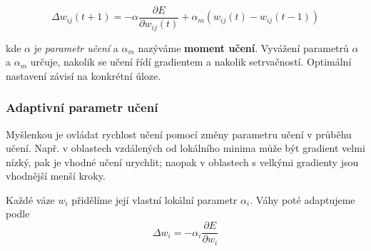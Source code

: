 \documentclass[11pt]{report} %
\numberwithin{equation}{section}
\begin{document}
$$
\Delta w_{ij}(t+1) = - \alpha \frac{\partial E}{\partial w_{ij}(t)} + \alpha_m(w_{ij}(t) - w_{ij}(t-1))
$$

kde $\alpha$ je \textit{parametr učení} a $\alpha_m$ nazýváme \textbf{moment učení}. Vyvážení parametrů $\alpha$ a $\alpha_m$ určuje, nakolik se učení řídí gradientem a nakolik setrvačností. Optimální nastavení závisí na konkrétní úloze.

\subsubsection{Adaptivní parametr učení}
Myšlenkou je ovládat rychlost učení pomocí změny parametru učení v průběhu učení. Např. v oblastech vzdálených od lokálního minima může být gradient velmi nízký, pak je vhodné učení urychlit; naopak v oblastech s velkými gradienty jsou vhodnější menší kroky.

Každé váze $w_i$ přidělíme její vlastní lokální parametr $\alpha_i$. Váhy poté adaptujeme podle $$\Delta w_i = - \alpha_i \frac{\partial E}{\partial w_i}$$
\end{document}
